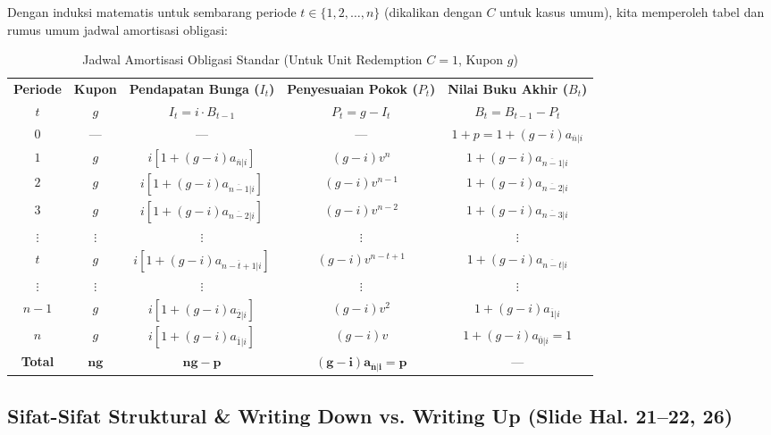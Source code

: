 \documentclass[11pt,a4paper]{article}
\begin{document}
Dengan induksi matematis untuk sembarang periode $t \in \{1, 2, \dots, n\}$ (dikalikan dengan $C$ untuk kasus umum), kita memperoleh tabel dan rumus umum jadwal amortisasi obligasi:

\begin{table}[htbp]
\centering
\small
\setlength{\tabcolsep}{4pt}
\caption{Jadwal Amortisasi Obligasi Standar (Untuk Unit Redemption $C = 1$, Kupon $g$)}
\label{tab:bond_amort_unit}
\vspace{0.5em}
\begin{tabular}{ccccc}
\toprule
\textbf{Periode} & \textbf{Kupon} & \textbf{Pendapatan Bunga ($I_t$)} & \textbf{Penyesuaian Pokok ($P_t$)} & \textbf{Nilai Buku Akhir ($B_t$)} \\
$t$ & $g$ & $I_t = i \cdot B_{t-1}$ & $P_t = g - I_t$ & $B_t = B_{t-1} - P_t$ \\
\midrule
$0$ & --- & --- & --- & $1 + p = 1 + (g - i)a_{\overline{n}|i}$ \\
$1$ & $g$ & $i[1 + (g - i)a_{\overline{n}|i}]$ & $(g - i)v^n$ & $1 + (g - i)a_{\overline{n-1}|i}$ \\
$2$ & $g$ & $i[1 + (g - i)a_{\overline{n-1}|i}]$ & $(g - i)v^{n-1}$ & $1 + (g - i)a_{\overline{n-2}|i}$ \\
$3$ & $g$ & $i[1 + (g - i)a_{\overline{n-2}|i}]$ & $(g - i)v^{n-2}$ & $1 + (g - i)a_{\overline{n-3}|i}$ \\
$\vdots$ & $\vdots$ & $\vdots$ & $\vdots$ & $\vdots$ \\
$t$ & $g$ & $i[1 + (g - i)a_{\overline{n-t+1}|i}]$ & $(g - i)v^{n-t+1}$ & $1 + (g - i)a_{\overline{n-t}|i}$ \\
$\vdots$ & $\vdots$ & $\vdots$ & $\vdots$ & $\vdots$ \\
$n-1$ & $g$ & $i[1 + (g - i)a_{\overline{2}|i}]$ & $(g - i)v^2$ & $1 + (g - i)a_{\overline{1}|i}$ \\
$n$ & $g$ & $i[1 + (g - i)a_{\overline{1}|i}]$ & $(g - i)v$ & $1 + (g - i)a_{\overline{0}|i} = 1$ \\
\midrule
\textbf{Total} & $\mathbf{ng}$ & $\mathbf{ng - p}$ & $\mathbf{(g - i)a_{\overline{n}|i} = p}$ & --- \\
\bottomrule
\end{tabular}
\end{table}

\subsection{Sifat-Sifat Struktural \& Writing Down vs. Writing Up (Slide Hal. 21--22, 26)}
\end{document}
